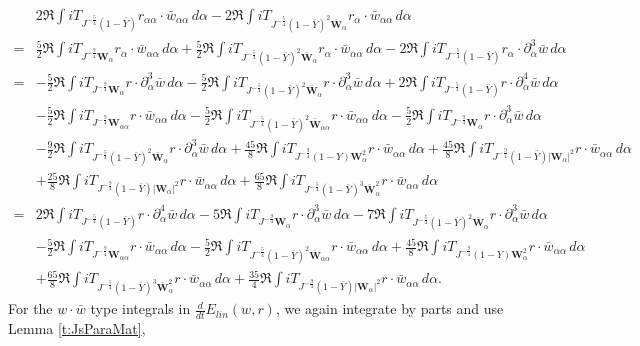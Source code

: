 \documentclass[10pt]{amsart}
\theoremstyle{remark}
\theoremstyle{definition}
\numberwithin{equation}{section}
\newcommand{\p}{\partial}
\newcommand{\al}{\alpha}
\newcommand{\f}{\frac}
\newcommand{\bw}{\mathbf{W}}
\begin{document}
\begin{align*}
 &2\Re \int iT_{J^{-\f54}(1-\bar{Y})}r_{\al \al}\cdot \bar{w}_{\al \al} \,d\alpha -2\Re \int iT_{J^{-\f54}(1-\bar{Y})^2 \bar{\bw}_\al}r_\al \cdot \bar{w}_{\al \al} \,d\al \\
 =& \f52\Re  \int iT_{J^{-\f94}\bw_{\al}}r_{\al }\cdot \bar{w}_{\al \al } \,d\al +\f52\Re \int iT_{J^{-\f54}(1-\bar{Y})^2 \bar{\bw}_\al}r_\al \cdot \bar{w}_{\al \al} \,d\al  -2\Re \int iT_{J^{-\f54}(1-\bar{Y})}r_{\al }\cdot \p_\al^3\bar{w} \,d\alpha \\
 =&- \f52\Re  \int iT_{J^{-\f94}\bw_{\al}}r\cdot \p_\al^3\bar{w} \,d\al -\f52\Re \int iT_{J^{-\f54}(1-\bar{Y})^2 \bar{\bw}_\al}r \cdot \p_\al^3\bar{w} \,d\al + 2\Re \int iT_{J^{-\f54}(1-\bar{Y})}r\cdot \p_\al^4\bar{w} \,d\alpha \\
 &-\f52\Re  \int iT_{J^{-\f94}\bw_{\al \al}}r\cdot \bar{w}_{\al \al } \,d\al - \f52\Re \int iT_{J^{-\f54}(1-\bar{Y})^2 \bar{\bw}_{\al\al}}r \cdot \bar{w}_{\al \al} \,d\al -\f52\Re  \int iT_{J^{-\f94}\bw_{\al}}r\cdot \p_\al^3\bar{w} \,d\al\\
 &-\f92\Re \int iT_{J^{-\f54}(1-\bar{Y})^2 \bar{\bw}_\al}r \cdot \p_\al^3\bar{w} \,d\al + \frac{45}{8}\Re \int i T_{J^{-\f94}(1-Y)\bw_\al^2}r \cdot \bar{w}_{\al \al} \,d\al + \frac{45}{8}\Re \int i T_{J^{-\f94}(1-\bar{Y})|\bw_\al|^2}r \cdot \bar{w}_{\al \al} \,d\al\\
& +  \f{25}8\Re \int i T_{J^{-\f94}(1-\bar{Y})|\bw_\al|^2}r \cdot \bar{w}_{\al \al} \,d\al + \frac{65}{8} \Re \int iT_{J^{-\f54}(1-\bar{Y})^3 \bar{\bw}_\al^2}r \cdot \bar{w}_{\al \al} \,d\al \\
  =&  2\Re \int iT_{J^{-\f54}(1-\bar{Y})}r\cdot \p_\al^4\bar{w} \,d\alpha - 5\Re  \int iT_{J^{-\f94}\bw_{\al}}r\cdot \p_\al^3\bar{w} \,d\al -7\Re \int iT_{J^{-\f54}(1-\bar{Y})^2 \bar{\bw}_\al}r \cdot \p_\al^3\bar{w} \,d\al \\
  &- \f52\Re  \int iT_{J^{-\f94}\bw_{\al \al}}r\cdot \bar{w}_{\al \al } \,d\al - \f52\Re \int iT_{J^{-\f54}(1-\bar{Y})^2 \bar{\bw}_{\al\al}}r \cdot \bar{w}_{\al \al} \,d\al
  + \frac{45}{8}\Re \int i T_{J^{-\f94}(1-Y)\bw_\al^2}r \cdot \bar{w}_{\al \al} \,d\al\\
  &+ \frac{65}{8}\Re \int iT_{J^{-\f54}(1-\bar{Y})^3 \bar{\bw}_\al^2}r \cdot \bar{w}_{\al \al} \,d\al 
  + \frac{35}{4}\Re \int i T_{J^{-\f94}(1-\bar{Y})|\bw_\al|^2}r \cdot \bar{w}_{\al \al} \,d\al.
\end{align*}
For the $w\cdot \bar{w}$ type integrals in  $\frac{d}{dt} E_{lin}(w,r)$, we again integrate by parts and use Lemma \ref{t:JsParaMat},
\end{document}
